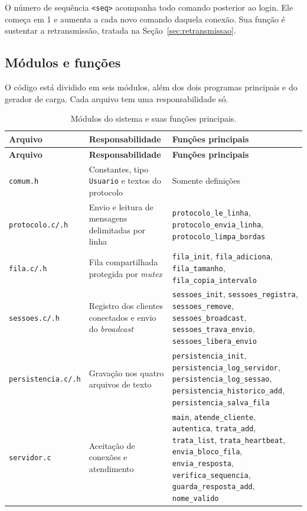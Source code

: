 \documentclass[12pt,a4paper]{article}
\begin{document}
O número de sequência \texttt{<seq>} acompanha todo comando posterior ao login.
Ele começa em 1 e aumenta a cada novo comando daquela conexão. Sua função é
sustentar a retransmissão, tratada na Seção~\ref{sec:retransmissao}.

\subsection{Módulos e funções}

O código está dividido em seis módulos, além dos dois programas principais e do
gerador de carga. Cada arquivo tem uma responsabilidade só.

{\footnotesize
\begin{longtable}{L{2.8cm} L{4.1cm} L{6.3cm}}
\caption{Módulos do sistema e suas funções principais.}\\
\toprule
\textbf{Arquivo} & \textbf{Responsabilidade} & \textbf{Funções principais} \\
\midrule
\endfirsthead
\toprule
\textbf{Arquivo} & \textbf{Responsabilidade} & \textbf{Funções principais} \\
\midrule
\endhead
\texttt{comum.h} &
Constantes, tipo \texttt{Usuario} e textos do protocolo &
Somente definições \\
\addlinespace
\texttt{protocolo.c/.h} &
Envio e leitura de mensagens delimitadas por linha &
\texttt{protocolo\_le\_linha}, \texttt{protocolo\_envia\_linha}, \texttt{protocolo\_limpa\_bordas} \\
\addlinespace
\texttt{fila.c/.h} &
Fila compartilhada protegida por \textit{mutex} &
\texttt{fila\_init}, \texttt{fila\_adiciona}, \texttt{fila\_tamanho}, \texttt{fila\_copia\_intervalo} \\
\addlinespace
\texttt{sessoes.c/.h} &
Registro dos clientes conectados e envio do \textit{broadcast} &
\texttt{sessoes\_init}, \texttt{sessoes\_registra}, \texttt{sessoes\_remove}, \texttt{sessoes\_broadcast}, \texttt{sessoes\_trava\_envio}, \texttt{sessoes\_libera\_envio} \\
\addlinespace
\texttt{persistencia.c/.h} &
Gravação nos quatro arquivos de texto &
\texttt{persistencia\_init}, \texttt{persistencia\_log\_servidor}, \texttt{persistencia\_log\_sessao}, \texttt{persistencia\_historico\_add}, \texttt{persistencia\_salva\_fila} \\
\addlinespace
\texttt{servidor.c} &
Aceitação de conexões e atendimento &
\texttt{main}, \texttt{atende\_cliente}, \texttt{autentica}, \texttt{trata\_add}, \texttt{trata\_list}, \texttt{trata\_heartbeat}, \texttt{envia\_bloco\_fila}, \texttt{envia\_resposta}, \texttt{verifica\_sequencia}, \texttt{guarda\_resposta\_add}, \texttt{nome\_valido} \\

\end{longtable}}
\end{document}
